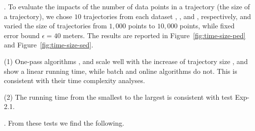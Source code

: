 .
To evaluate the impacts of the number of data points in a trajectory (\ie the size of a trajectory),
we chose $10$ trajectories from each dataset \ucar, \geolife, \mopsi and \act, respectively,
and varied the size  of trajectories from $1,000$ points to $10,000$ points, while fixed error bound $\epsilon = 40$ meters.
The results are reported in Figure~\ref{fig:time-size-ped} and Figure~\ref{fig:time-size-sed}.

\sstab(1) One-pass algorithms \siped, \operb and \cised scale well with the increase of trajectory size ,
and show a linear running time, while batch and online algorithms do not.
This is consistent with their time complexity analyses.

\sstab(2) The running time from the smallest to the largest is consistent with test {Exp-2.1}.




.
From these tests we find the following.

